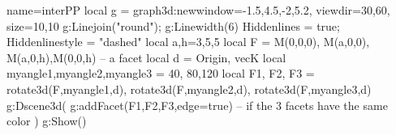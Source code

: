 \documentclass[12pt]{standalone}
\begin{document}
\begin{luadraw}{name=interPP}
local g = graph3d:new{window={-1.5,4.5,-2,5.2}, viewdir={30,60}, size={10,10}}
g:Linejoin("round"); g:Linewidth(6)
Hiddenlines = true; Hiddenlinestyle = "dashed"
local a,h=3,5,5
local F = {M(0,0,0), M(a,0,0), M(a,0,h),M(0,0,h)} -- a facet
local d = {Origin, vecK}
local myangle1,myangle2,myangle3 = 40, 80,120
local F1, F2, F3 = rotate3d(F,myangle1,d), rotate3d(F,myangle2,d), rotate3d(F,myangle3,d)
 g:Dscene3d(
    g:addFacet({F1,F2,F3},{edge=true}) -- if the 3 facets have the same color
    )
g:Show()
\end{luadraw}
\end{document}
